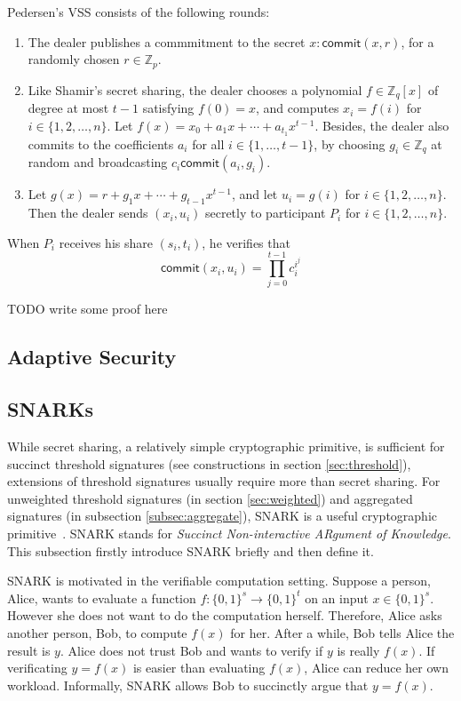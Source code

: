 Pedersen's VSS consists of the following rounds:

\begin{enumerate}
    \item The dealer publishes a commmitment to the secret $x: \mathsf{commit}(x, r)$, for a randomly chosen $r\in\mathbb{Z}_p$. 
    \item Like Shamir's secret sharing, the dealer chooses a polynomial $f\in \mathbb{Z}_q[x]$ of degree at most $t-1$ satisfying $f(0)=x$, and computes $x_i=f(i)$ for $i\in\{1,2,\dots, n\}$. Let $f(x) = x_0 + a_1 x + \cdots + a_{t_1} x^{t-1}$. Besides, the dealer also commits to the coefficients $a_i$ for all $i\in\{1,\dots, t-1\}$, by choosing $g_i\in \mathbb{Z}_q$ at random and broadcasting $c_i\mathsf{commit}(a_i, g_i)$. 
    \item Let $g(x)=r + g_1 x + \cdots + g_{t-1}x^{t-1}$, and let $u_i=g(i)$ for $i\in\{1,2,\dots, n\}$. Then the dealer sends $(x_i, u_i)$ secretly to participant $P_i$ for $i\in\{1,2,\dots, n\}$. 
\end{enumerate}

When $P_i$ receives his share $(s_i, t_i)$, he verifies that 
\begin{equation*}
    \mathsf{commit}(x_i, u_i) = \prod_{j=0}^{t-1} c_i^{i^j}
\end{equation*}  

{\color{red} TODO write some proof here}




\subsection{Adaptive Security}


\subsection{SNARKs}
While secret sharing, a relatively simple cryptographic primitive, is sufficient for succinct threshold signatures (see constructions in section \ref{sec:threshold}), extensions of threshold signatures usually require more than secret sharing. For unweighted threshold signatures (in section \ref{sec:weighted}) and aggregated signatures (in subsection \ref{subsec:aggregate}), SNARK is a useful cryptographic primitive~\cite{DBLP:conf/ccs/DasCXNB023}. SNARK stands for \textit{Succinct Non-interactive ARgument of Knowledge}. This subsection firstly introduce SNARK briefly and then define it. 

SNARK is motivated in the verifiable computation setting. Suppose a person, Alice, wants to evaluate a function $f:\{0,1\}^{s}\to \{0,1\}^t$ on an input $x\in \{0,1\}^s$. However she does not want to do the computation herself. Therefore, Alice asks another person, Bob, to compute $f(x)$ for her. After a while, Bob tells Alice the result is $y$. Alice does not trust Bob and wants to verify if $y$ is really $f(x)$. If verificating $y=f(x)$ is easier than evaluating $f(x)$, Alice can reduce her own workload. Informally, SNARK allows Bob to succinctly argue that $y=f(x)$. 

